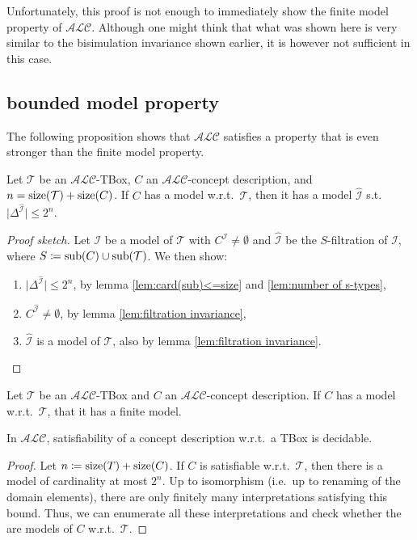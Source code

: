 Unfortunately, this proof is not enough to immediately show the finite model property of $\mathcal{ALC}$.
Although one might think that what was shown here is very similar to the bisimulation invariance shown earlier,
it is however not sufficient in this case.

\subsection{bounded model property}
The following proposition shows that $\mathcal{ALC}$ satisfies a property that is even stronger than the finite model property.
\begin{theorem}
	Let $\mathcal{T}$ be an $\mathcal{ALC}$-TBox, $C$ an $\mathcal{ALC}$-concept description, and $n = \operatorname{\text{size}}(\mathcal{T}) + \operatorname{\text{size}}(C)$.
	If $C$ has a model w.r.t.\ $\mathcal{T}$, then it has a model $\widehat{\mathcal{I}}$ s.t. $\lvert \Delta^{\widehat{\mathcal{I}}} \rvert \leq 2^n$.
\end{theorem}
\begin{proof}[Proof sketch]
	Let $\mathcal{I}$ be a model of $\mathcal{T}$ with $C^{\mathcal{I}} \neq \emptyset$ and $\widehat{\mathcal{I}}$ be the $S$-filtration of $\mathcal{I}$,
	where $S \coloneqq \operatorname{\text{sub}}(C) \cup \operatorname{\text{sub}}(\mathcal{T})$.
	We then show:
	\begin{enumerate}
		\item $\lvert \Delta^{\widehat{\mathcal{I}}} \rvert \leq 2^{n}$, by lemma \ref{lem:card(sub)<=size} and \ref{lem:number of s-types},
		\item $C^{\widehat{\mathcal{I}}} \neq \emptyset$, by lemma \ref{lem:filtration invariance},
		\item $\widehat{\mathcal{I}}$ is a model of $\mathcal{T}$, also by lemma \ref{lem:filtration invariance}. \qedhere
	\end{enumerate}
\end{proof}

\begin{corollary}
	Let $\mathcal{T}$ be an $\mathcal{ALC}$-TBox and $C$ an $\mathcal{ALC}$-concept description.
	If $C$ has a model w.r.t.\ $\mathcal{T}$, that it has a finite model.
\end{corollary}

\begin{corollary}[Decidability]
	In $\mathcal{ALC}$, satisfiability of a concept description w.r.t.\ a TBox is decidable.
\end{corollary}
\begin{proof}
	Let $n \coloneqq \operatorname{\text{size}}(T) + \operatorname{\text{size}}(C)$.
	If $C$ is satisfiable w.r.t.\ $\mathcal{T}$, then there is a model of cardinality at most $2^{n}$.
	Up to isomorphism (i.e.\, up to renaming of the domain elements), there are only finitely many interpretations satisfying this bound.
	Thus, we can enumerate all these interpretations and check whether the are models of $C$ w.r.t.\ $\mathcal{T}$.
\end{proof}

